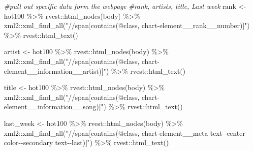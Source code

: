 \documentclass[
]{article}
\newenvironment{Shaded}{\begin{snugshade}}{\end{snugshade}}
\newcommand{\CommentTok}[1]{\textcolor[rgb]{0.56,0.35,0.01}{\textit{#1}}}
\newcommand{\FunctionTok}[1]{\textcolor[rgb]{0.00,0.00,0.00}{#1}}
\newcommand{\NormalTok}[1]{#1}
\newcommand{\OtherTok}[1]{\textcolor[rgb]{0.56,0.35,0.01}{#1}}
\newcommand{\SpecialCharTok}[1]{\textcolor[rgb]{0.00,0.00,0.00}{#1}}
\newcommand{\StringTok}[1]{\textcolor[rgb]{0.31,0.60,0.02}{#1}}
\begin{document}
\begin{Shaded}
\begin{Highlighting}[]
\CommentTok{\#pull out specific data form the webpage}
\CommentTok{\#rank, artists, title, Last week}
\NormalTok{rank }\OtherTok{\textless{}{-}}\NormalTok{ hot100 }\SpecialCharTok{\%\textgreater{}\%} 
\NormalTok{  rvest}\SpecialCharTok{::}\FunctionTok{html\_nodes}\NormalTok{(}\StringTok{\textquotesingle{}body\textquotesingle{}}\NormalTok{) }\SpecialCharTok{\%\textgreater{}\%} 
\NormalTok{  xml2}\SpecialCharTok{::}\FunctionTok{xml\_find\_all}\NormalTok{(}\StringTok{"//span[contains(@class,}
\StringTok{                     \textquotesingle{}chart{-}element\_\_rank\_\_number\textquotesingle{})]"}\NormalTok{) }\SpecialCharTok{\%\textgreater{}\%} 
\NormalTok{  rvest}\SpecialCharTok{::}\FunctionTok{html\_text}\NormalTok{()}

\NormalTok{artist }\OtherTok{\textless{}{-}}\NormalTok{ hot100 }\SpecialCharTok{\%\textgreater{}\%} 
\NormalTok{  rvest}\SpecialCharTok{::}\FunctionTok{html\_nodes}\NormalTok{(}\StringTok{\textquotesingle{}body\textquotesingle{}}\NormalTok{) }\SpecialCharTok{\%\textgreater{}\%} 
\NormalTok{  xml2}\SpecialCharTok{::}\FunctionTok{xml\_find\_all}\NormalTok{(}\StringTok{"//span[contains(@class,                     \textquotesingle{}chart{-}element\_\_information\_\_artist\textquotesingle{})]"}\NormalTok{) }\SpecialCharTok{\%\textgreater{}\%}
\NormalTok{  rvest}\SpecialCharTok{::}\FunctionTok{html\_text}\NormalTok{()}

\NormalTok{title }\OtherTok{\textless{}{-}}\NormalTok{ hot100 }\SpecialCharTok{\%\textgreater{}\%} 
\NormalTok{  rvest}\SpecialCharTok{::}\FunctionTok{html\_nodes}\NormalTok{(}\StringTok{\textquotesingle{}body\textquotesingle{}}\NormalTok{) }\SpecialCharTok{\%\textgreater{}\%} 
\NormalTok{  xml2}\SpecialCharTok{::}\FunctionTok{xml\_find\_all}\NormalTok{(}\StringTok{"//span[contains(@class,}
\StringTok{ \textquotesingle{}chart{-}element\_\_information\_\_song\textquotesingle{})]"}\NormalTok{) }\SpecialCharTok{\%\textgreater{}\%} 
\NormalTok{  rvest}\SpecialCharTok{::}\FunctionTok{html\_text}\NormalTok{()}

\NormalTok{ last\_week }\OtherTok{\textless{}{-}}\NormalTok{ hot100 }\SpecialCharTok{\%\textgreater{}\%} 
\NormalTok{  rvest}\SpecialCharTok{::}\FunctionTok{html\_nodes}\NormalTok{(}\StringTok{\textquotesingle{}body\textquotesingle{}}\NormalTok{) }\SpecialCharTok{\%\textgreater{}\%} 
\NormalTok{  xml2}\SpecialCharTok{::}\FunctionTok{xml\_find\_all}\NormalTok{(}\StringTok{"//span[contains(@class,}
\StringTok{ \textquotesingle{}chart{-}element\_\_meta text{-}{-}center color{-}{-}secondary text{-}{-}last\textquotesingle{})]"}\NormalTok{) }\SpecialCharTok{\%\textgreater{}\%} 
\NormalTok{  rvest}\SpecialCharTok{::}\FunctionTok{html\_text}\NormalTok{()}
\end{Highlighting}
\end{Shaded}
\end{document}
